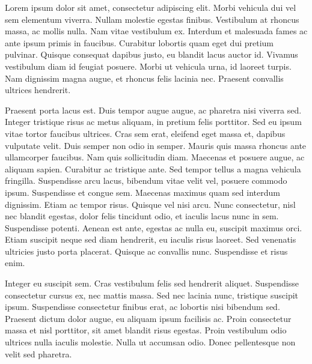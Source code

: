 \pg
Lorem ipsum dolor sit amet, consectetur adipiscing elit. Morbi vehicula dui vel sem elementum viverra. Nullam molestie egestas finibus. Vestibulum at rhoncus massa, ac mollis nulla. Nam vitae vestibulum ex. Interdum et malesuada fames ac ante ipsum primis in faucibus. Curabitur lobortis quam eget dui pretium pulvinar. Quisque consequat dapibus justo, eu blandit lacus auctor id. Vivamus vestibulum diam id feugiat posuere. Morbi ut vehicula urna, id laoreet turpis. Nam dignissim magna augue, et rhoncus felis lacinia nec. Praesent convallis ultrices hendrerit.

\pg
Praesent porta lacus est. Duis tempor augue augue, ac pharetra nisi viverra sed. Integer tristique risus ac metus aliquam, in pretium felis porttitor. Sed eu ipsum vitae tortor faucibus ultrices. Cras sem erat, eleifend eget massa et, dapibus vulputate velit. Duis semper non odio in semper. Mauris quis massa rhoncus ante ullamcorper faucibus. Nam quis sollicitudin diam. Maecenas et posuere augue, ac aliquam sapien. Curabitur ac tristique ante. Sed tempor tellus a magna vehicula fringilla. Suspendisse arcu lacus, bibendum vitae velit vel, posuere commodo ipsum. Suspendisse et congue sem. Maecenas maximus quam sed interdum dignissim. Etiam ac tempor risus. Quisque vel nisi arcu. Nunc consectetur, nisl nec blandit egestas, dolor felis tincidunt odio, et iaculis lacus nunc in sem. Suspendisse potenti. Aenean est ante, egestas ac nulla eu, suscipit maximus orci. Etiam suscipit neque sed diam hendrerit, eu iaculis risus laoreet. Sed venenatis ultricies justo porta placerat. Quisque ac convallis nunc. Suspendisse et risus enim.

\pg
Integer eu suscipit sem. Cras vestibulum felis sed hendrerit aliquet. Suspendisse consectetur cursus ex, nec mattis massa. Sed nec lacinia nunc, tristique suscipit ipsum. Suspendisse consectetur finibus erat, ac lobortis nisi bibendum sed. Praesent dictum dolor augue, eu aliquam ipsum facilisis ac. Proin consectetur massa et nisl porttitor, sit amet blandit risus egestas. Proin vestibulum odio ultrices nulla iaculis molestie. Nulla ut accumsan odio. Donec pellentesque non velit sed pharetra.